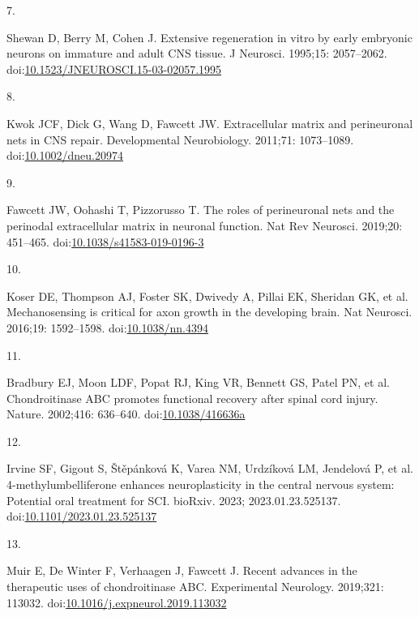 \documentclass[
  12pt,
  a4paper,
]{book}
\newlength{\cslhangindent}
\newlength{\csllabelwidth}
\newlength{\cslentryspacingunit} %
\newenvironment{CSLReferences}[2] %
 {%
  \setlength{\parindent}{0pt}
  \ifodd #1
  \let\oldpar\par
  \def\par{\hangindent=\cslhangindent\oldpar}
  \fi
  \setlength{\parskip}{#2\cslentryspacingunit}
 }%
 {}
\newcommand{\CSLLeftMargin}[1]{\parbox[t]{\csllabelwidth}{#1}}
\newcommand{\CSLRightInline}[1]{\parbox[t]{\linewidth - \csllabelwidth}{#1}\break}
\begin{document}
\begin{CSLReferences}{0}{0}
\leavevmode{}%
\CSLLeftMargin{7. }%
\CSLRightInline{Shewan D, Berry M, Cohen J. Extensive regeneration in vitro by early embryonic neurons on immature and adult {CNS} tissue. J Neurosci. 1995;15: 2057--2062. doi:\href{https://doi.org/10.1523/JNEUROSCI.15-03-02057.1995}{10.1523/JNEUROSCI.15-03-02057.1995}}

\leavevmode{}%
\CSLLeftMargin{8. }%
\CSLRightInline{Kwok JCF, Dick G, Wang D, Fawcett JW. Extracellular matrix and perineuronal nets in {CNS} repair. Developmental Neurobiology. 2011;71: 1073--1089. doi:\href{https://doi.org/10.1002/dneu.20974}{10.1002/dneu.20974}}

\leavevmode{}%
\CSLLeftMargin{9. }%
\CSLRightInline{Fawcett JW, Oohashi T, Pizzorusso T. The roles of perineuronal nets and the perinodal extracellular matrix in neuronal function. Nat Rev Neurosci. 2019;20: 451--465. doi:\href{https://doi.org/10.1038/s41583-019-0196-3}{10.1038/s41583-019-0196-3}}

\leavevmode{}%
\CSLLeftMargin{10. }%
\CSLRightInline{Koser DE, Thompson AJ, Foster SK, Dwivedy A, Pillai EK, Sheridan GK, et al. Mechanosensing is critical for axon growth in the developing brain. Nat Neurosci. 2016;19: 1592--1598. doi:\href{https://doi.org/10.1038/nn.4394}{10.1038/nn.4394}}

\leavevmode{}%
\CSLLeftMargin{11. }%
\CSLRightInline{Bradbury EJ, Moon LDF, Popat RJ, King VR, Bennett GS, Patel PN, et al. Chondroitinase {ABC} promotes functional recovery after spinal cord injury. Nature. 2002;416: 636--640. doi:\href{https://doi.org/10.1038/416636a}{10.1038/416636a}}

\leavevmode{}%
\CSLLeftMargin{12. }%
\CSLRightInline{Irvine SF, Gigout S, Štěpánková K, Varea NM, Urdzíková LM, Jendelová P, et al. 4-methylumbelliferone enhances neuroplasticity in the central nervous system: Potential oral treatment for {SCI}. bioRxiv. 2023; 2023.01.23.525137. doi:\href{https://doi.org/10.1101/2023.01.23.525137}{10.1101/2023.01.23.525137}}

\leavevmode{}%
\CSLLeftMargin{13. }%
\CSLRightInline{Muir E, De Winter F, Verhaagen J, Fawcett J. Recent advances in the therapeutic uses of chondroitinase {ABC}. Experimental Neurology. 2019;321: 113032. doi:\href{https://doi.org/10.1016/j.expneurol.2019.113032}{10.1016/j.expneurol.2019.113032}}


\end{CSLReferences}
\end{document}
